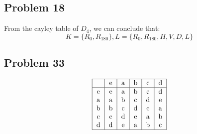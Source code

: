 \documentclass[a4paper,12pt]{article}
\begin{document}
\subsection*{Problem 18}
From the cayley table of $D_4$, we can conclude that:
\[K=\{R_0, R_{180}\}, L=\{R_0, R_{180}, H, V, D, L\}\] 
\subsection*{Problem 33}
\[\begin{tabular}{|c|c|c|c|c|c|c|}
    \hline
     &e&a&b&c&d\\
    \hline
    e&e&a&b&c&d\\
    a&a&b&c&d&e\\
    b&b&c&d&e&a\\
    c&c&d&e&a&b\\
    d&d&e&a&b&c\\
    \hline
\end{tabular}\]
\end{document}
